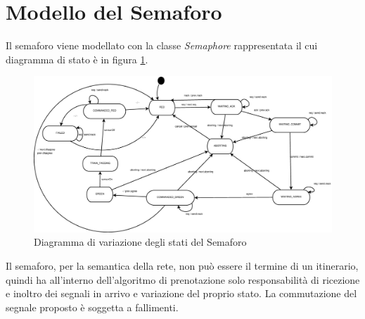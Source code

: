 \section{Modello del Semaforo}
Il semaforo viene modellato con la classe \textit{Semaphore} rappresentata il cui diagramma di stato è in figura \ref{fig:semaforo}.
\begin{figure}

\centering
\includegraphics[width=24cm]{imgs/Semaphore.eps}

\caption{Diagramma di variazione degli stati del Semaforo}\label{fig:semaforo}

\end{figure}

Il semaforo, per la semantica della rete, non può essere il termine di un
itinerario, quindi ha all'interno dell'algoritmo di prenotazione solo
responsabilità di ricezione e inoltro dei segnali in arrivo e variazione del
proprio stato. La commutazione del segnale proposto è soggetta a fallimenti.

